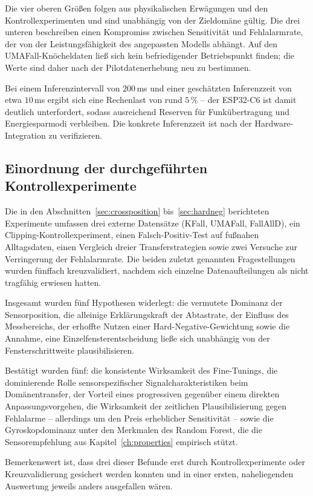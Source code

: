 \documentclass[11pt,a4paper,oneside]{report}
\begin{document}
Die vier oberen Größen folgen aus physikalischen Erwägungen und den
Kontrollexperimenten und sind unabhängig von der Zieldomäne gültig.
Die drei unteren beschreiben einen Kompromiss zwischen Sensitivität
und Fehlalarmrate, der von der Leistungsfähigkeit des angepassten
Modells abhängt. Auf den UMAFall-Knöcheldaten ließ sich kein
befriedigender Betriebspunkt finden; die Werte sind daher nach der
Pilotdatenerhebung neu zu bestimmen.

Bei einem Inferenzintervall von $200$\,ms und einer geschätzten
Inferenzzeit von etwa $10$\,ms ergibt sich eine Rechenlast von rund
$5\,\%$ -- der ESP32-C6 ist damit deutlich unterfordert, sodass
ausreichend Reserven für Funkübertragung und Energiesparmodi
verbleiben. Die konkrete Inferenzzeit ist nach der
Hardware-Integration zu verifizieren.

\subsection{Einordnung der durchgeführten Kontrollexperimente}

Die in den Abschnitten~\ref{sec:crossposition}
bis~\ref{sec:hardneg} berichteten Experimente umfassen drei
externe Datensätze (KFall, UMAFall, FallAllD), ein
Clipping-Kontrollexperiment, einen Falsch-Positiv-Test auf fußnahen
Alltagsdaten, einen Vergleich dreier Transferstrategien sowie zwei
Versuche zur Verringerung der Fehlalarmrate. Die beiden zuletzt
genannten Fragestellungen wurden fünffach kreuzvalidiert, nachdem
sich einzelne Datenaufteilungen als nicht tragfähig erwiesen hatten.

Insgesamt wurden fünf Hypothesen widerlegt: die vermutete Dominanz
der Sensorposition, die alleinige Erklärungskraft der Abtastrate, der
Einfluss des Messbereichs, der erhoffte Nutzen einer
Hard-Negative-Gewichtung sowie die Annahme, eine
Einzelfensterentscheidung ließe sich unabhängig von der
Fensterschrittweite plausibilisieren.

Bestätigt wurden fünf: die konsistente Wirksamkeit des Fine-Tunings,
die dominierende Rolle sensorspezifischer Signalcharakteristiken beim
Domänentransfer, der Vorteil eines progressiven gegenüber einem
direkten Anpassungsvorgehen, die Wirksamkeit der zeitlichen
Plausibilisierung gegen Fehlalarme -- allerdings um den Preis
erheblicher Sensitivität -- sowie die Gyroskopdominanz unter den
Merkmalen des Random Forest, die die Sensorempfehlung aus
Kapitel~\ref{ch:properties} empirisch stützt.

Bemerkenswert ist, dass drei dieser Befunde erst durch
Kontrollexperimente oder Kreuzvalidierung gesichert werden konnten
und in einer ersten, naheliegenden Auswertung jeweils anders
ausgefallen wären.
\end{document}
